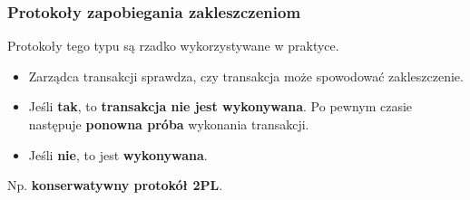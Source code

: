 \documentclass[a4paper]{article}
\begin{document}
\subsubsection{Protokoły zapobiegania zakleszczeniom}
Protokoły	tego	typu	są	rzadko	wykorzystywane	w	praktyce.
\begin{itemize}
    \item Zarządca	transakcji	sprawdza, czy transakcja	 może spowodować zakleszczenie.
    \item Jeśli \textbf{tak}, to	 \textbf{transakcja	 nie	 jest wykonywana}.	Po	pewnym	czasie	następuje	\textbf{ponowna próba}	wykonania	transakcji.
    \item Jeśli \textbf{nie}, to jest \textbf{wykonywana}.
\end{itemize}
Np. \textbf{konserwatywny	protokół 2PL}.
\end{document}
